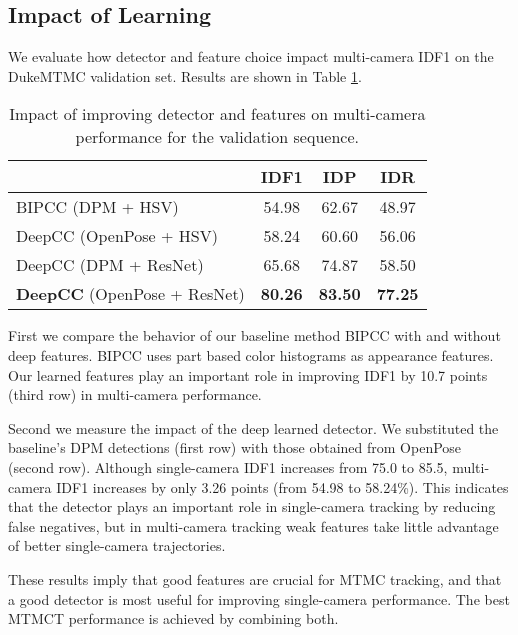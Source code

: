 \documentclass[10pt,twocolumn,letterpaper]{article}
\begin{document}
\subsection{Impact of Learning}

We evaluate how detector and feature choice impact multi-camera IDF1 on the DukeMTMC validation set. Results are shown in Table \ref{tab:ablation}.

\begin{table}[H]
	\small
	\begin{center}
		\begin{tabular}{ |l | c | c | c |}
			\hline
			& IDF1  & IDP  & IDR \\ \hline
			BIPCC  (DPM + HSV)~\cite{ristani2016performance}       & 54.98  & 62.67  & 48.97 \\ 
			DeepCC (OpenPose + HSV) & 58.24  & 60.60  & 56.06 \\ 
			DeepCC (DPM + ResNet) & 65.68  & 74.87  & 58.50 \\ 
			\hline
			\textbf{DeepCC} (OpenPose + ResNet) & \textbf{80.26} & \textbf{83.50} & \textbf{77.25} \\ \hline
			
		\end{tabular}
	\end{center}
	\caption{Impact of improving detector and features on multi-camera  performance for the validation sequence.}
	\label{tab:ablation}
\end{table}

First we compare the behavior of our baseline method BIPCC with and without deep features. BIPCC uses part based color histograms as appearance features. Our learned features play an important role in improving IDF1 by 10.7 points (third row) in multi-camera performance. 

Second we measure the impact of the deep learned detector. We substituted the baseline's DPM detections (first row) with those obtained from OpenPose~\cite{cao2017realtime} (second row). Although  single-camera IDF1 increases from 75.0 to 85.5, multi-camera IDF1 increases by only 3.26 points (from 54.98 to 58.24\%). This indicates that the detector plays an important role in single-camera tracking by reducing false negatives, but in multi-camera tracking weak features take little advantage of better single-camera trajectories. 

These results imply that good features are crucial for MTMC tracking, and that a good detector is most useful for improving single-camera performance. The best MTMCT performance is achieved by combining both.
\end{document}
